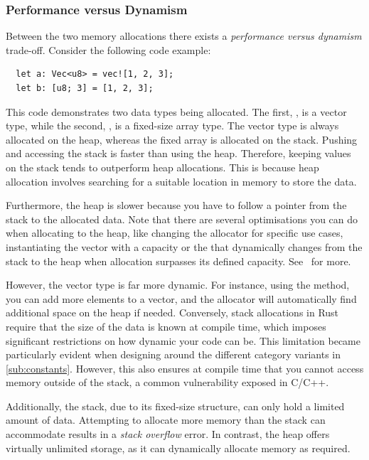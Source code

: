 \documentclass[11pt]{report}
\theoremstyle{definition}
\theoremstyle{plain}
\begin{document}
\subsubsection{Performance versus Dynamism}

Between the two memory allocations there exists a \textit{performance versus dynamism} trade-off. Consider the following code example:

\begin{verbatim}
  let a: Vec<u8> = vec![1, 2, 3];
  let b: [u8; 3] = [1, 2, 3];
\end{verbatim}

This code demonstrates two data types being allocated. The first, , is a vector type, while the second, , is a fixed-size array type. The vector type is always allocated on the heap, whereas the fixed array is allocated on the stack. Pushing and accessing the stack is faster than using the heap. Therefore, keeping values on the stack tends to outperform heap allocations. This is because heap allocation involves searching for a suitable location in memory to store the data.

Furthermore, the heap is slower because you have to follow a pointer from the stack to the allocated data. Note that there are several optimisations you can do when allocating to the heap, like changing the allocator for specific use cases, instantiating the vector with a capacity or the  that dynamically changes from the stack to the heap when allocation surpasses its defined capacity. See~\cite{rustlangPerformanceBook} for more.

However, the vector type is far more dynamic. For instance, using the  method, you can add more elements to a vector, and the allocator will automatically find additional space on the heap if needed. Conversely, stack allocations in Rust require that the size of the data is known at compile time, which imposes significant restrictions on how dynamic your code can be. This limitation became particularly evident when designing around the different category variants in \autoref{sub:constants}. However, this also ensures at compile time that you cannot access memory outside of the stack, a common vulnerability exposed in C/C++.

Additionally, the stack, due to its fixed-size structure, can only hold a limited amount of data. Attempting to allocate more memory than the stack can accommodate results in a \textit{stack overflow} error. In contrast, the heap offers virtually unlimited storage, as it can dynamically allocate memory as required.
\end{document}
